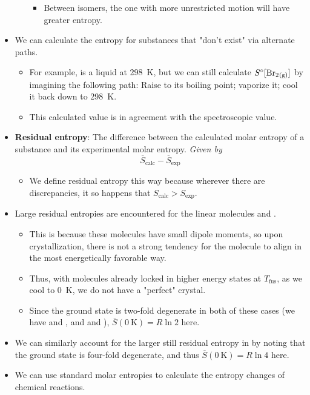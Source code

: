 \documentclass[../notes.tex]{subfiles}
\begin{document}
\begin{itemize}
\begin{enumerate}
        \begin{itemize}
            \item Between isomers, the one with more unrestricted motion will have greater entropy.
        \end{itemize}
    \end{enumerate}
    \item We can calculate the entropy for substances that "don't exist" via alternate paths.
    \begin{itemize}
        \item For example,  is a liquid at \SI{298}{\kelvin}, but we can still calculate $S^\circ[\ce{Br2_{(g)}}]$ by imagining the following path: Raise  to its boiling point; vaporize it; cool it back down to \SI{298}{\kelvin}.
        \item This calculated value is in agreement with the spectroscopic value.
    \end{itemize}
    \item \textbf{Residual entropy}: The difference between the calculated molar entropy of a substance and its experimental molar entropy. \emph{Given by}
    \begin{equation*}
        \overline{S}_\text{calc}-\overline{S}_\text{exp}
    \end{equation*}
    \begin{itemize}
        \item We define residual entropy this way because wherever there are discrepancies, it so happens that $S_\text{calc}>S_\text{exp}$.
    \end{itemize}
    \item Large residual entropies are encountered for the linear molecules  and .
    \begin{itemize}
        \item This is because these molecules have small dipole moments, so upon crystallization, there is not a strong tendency for the molecule to align in the most energetically favorable way.
        \item Thus, with molecules already locked in higher energy states at $T_\text{fus}$, as we cool to \SI{0}{\kelvin}, we do not have a "perfect" crystal.
        \item Since the ground state is two-fold degenerate in both of these cases (we have  and , and  and ), $\overline{S}(\SI{0}{\kelvin})=R\ln 2$ here.
    \end{itemize}
    \item We can similarly account for the larger still residual entropy in  by noting that the ground state is four-fold degenerate, and thus $\overline{S}(\SI{0}{\kelvin})=R\ln 4$ here.
    \item We can use standard molar entropies to calculate the entropy changes of chemical reactions.
\end{itemize}
\end{document}
